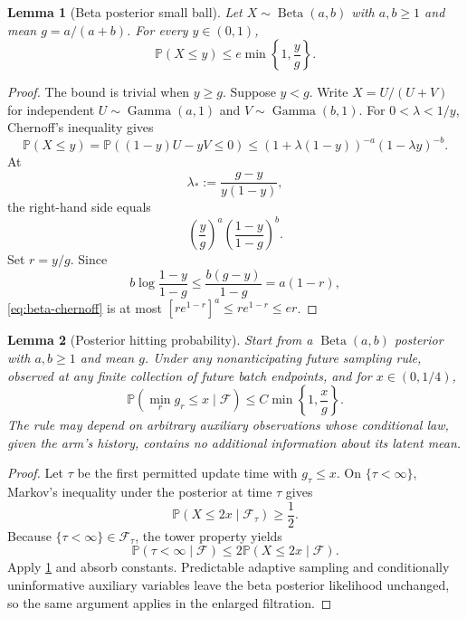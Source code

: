 \documentclass[11pt,letterpaper]{article}
\numberwithin{equation}{section}
\newtheorem{lemma}[lemma]{Lemma}
\theoremstyle{definition}
\theoremstyle{remark}
\newcommand{\Pp}{\mathbb{P}}
\newcommand{\1}{\mathbf{1}}
\newcommand{\F}{\mathcal{F}}
\newcommand{\BetaDist}{\operatorname{Beta}}
\begin{document}
\begin{lemma}[Beta posterior small ball]\label{lem:beta-small-ball}
Let $X\sim\BetaDist(a,b)$ with $a,b\ge1$ and mean $g=a/(a+b)$.  For every
$y\in(0,1)$,
\begin{equation}\label{eq:beta-small-ball}
  \Pp(X\le y)
  \le e\min\left\{1,\frac{y}{g}\right\}.
\end{equation}
\end{lemma}

\begin{proof}
The bound is trivial when $y\ge g$.  Suppose $y<g$.  Write
$X=U/(U+V)$ for independent $U\sim\operatorname{Gamma}(a,1)$ and
$V\sim\operatorname{Gamma}(b,1)$.  For
$0<\lambda<1/y$, Chernoff's inequality gives
\[
  \Pp(X\le y)
  =\Pp((1-y)U-yV\le0)
  \le (1+\lambda(1-y))^{-a}(1-\lambda y)^{-b}.
\]
At
\[
  \lambda_*:=\frac{g-y}{y(1-y)},
\]
the right-hand side equals
\begin{equation}\label{eq:beta-chernoff}
  \left(\frac{y}{g}\right)^a
  \left(\frac{1-y}{1-g}\right)^b.
\end{equation}
Set $r=y/g$.  Since
\[
  b\log\frac{1-y}{1-g}
  \le \frac{b(g-y)}{1-g}
  =a(1-r),
\]
\cref{eq:beta-chernoff} is at most
$[r e^{1-r}]^a\le r e^{1-r}\le er$.
\end{proof}

\begin{lemma}[Posterior hitting probability]\label{lem:posterior-hitting}
Start from a $\BetaDist(a,b)$ posterior with $a,b\ge1$ and mean $g$.  Under any nonanticipating future
sampling rule, observed at any finite collection of future batch endpoints, and
for $x\in(0,1/4)$,
\begin{equation}\label{eq:hitting}
  \Pp\!\left(\min_r g_r\le x\mid\F\right)
  \le C\min\left\{1,\frac{x}{g}\right\}.
\end{equation}
The rule may depend on arbitrary auxiliary observations whose conditional law,
given the arm's history, contains no additional information about its latent
mean.
\end{lemma}

\begin{proof}
Let $\tau$ be the first permitted update time with $g_\tau\le x$.  On
$\{\tau<\infty\}$, Markov's inequality under the posterior at time $\tau$
gives
\[
  \Pp(X\le2x\mid\F_\tau)\ge\frac12.
\]
Because $\{\tau<\infty\}\in\F_\tau$, the tower property yields
\[
  \Pp(\tau<\infty\mid\F)
  \le2\Pp(X\le2x\mid\F).
\]
Apply \cref{lem:beta-small-ball} and absorb constants.  Predictable adaptive
sampling and conditionally uninformative auxiliary variables leave the beta
posterior likelihood unchanged, so the same argument applies in the enlarged
filtration.
\end{proof}
\end{document}
